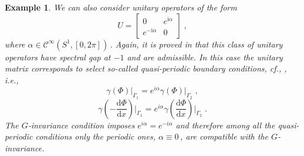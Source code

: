 \documentclass[a4paper,12pt]{amsart}
\renewcommand{\d}{\mathrm{d}}
\newcommand{\C}{\mathcal{C}}
\newcommand{\1}{\mathbb{I}}
\newtheorem{example}[theorem]{Example}
\numberwithin{equation}{section}
\numberwithin{theorem}{section}
\begin{document}
\begin{example}
We can also consider unitary operators of the form
\begin{equation}%
U=\begin{bmatrix} 0 & e^{\mathrm{i}\alpha} \\ e^{-\mathrm{i}\alpha} & 0 \end{bmatrix}\;,
\end{equation}
where $\alpha\in \C^\infty (S^1,[0,2\pi])$\,. Again, it is proved in \cite{ILP13} that this class of unitary operators have spectral 
gap at $-1$ and are admissible.  
In this case the unitary matrix corresponds to select so-called quasi-periodic boundary conditions, 
cf., \cite{asorey83}, i.e.,
\begin{equation*}
  \gamma(\Phi)\bigr|_{\Gamma_1}=e^{i\alpha}\gamma(\Phi)\bigr|_{\Gamma_2}\;,
\end{equation*}
\begin{equation*}
  \gamma\left(-\frac{\d\Phi}{\d x}\right)\biggr|_{\Gamma_1}=e^{i\alpha}\gamma\left(\frac{\d\Phi}{\d x}\right)\biggr|_{\Gamma_2}\;.
\end{equation*}
The $G$-invariance condition imposes $e^{i\alpha}=e^{-i\alpha}$ and therefore among all the quasi-periodic conditions only the
periodic ones, $\alpha\equiv0$\,, are compatible with the $G$-invariance. 
\end{example}
\end{document}
